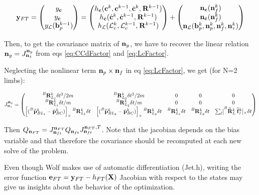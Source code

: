\documentclass[11pt]{article}
\newcommand{\Rot}[2]{\prescript{#1}{}{\bfR}_{#2}}
\newcommand{\Rotm}[2]{\prescript{#1}{}{\widetilde{\bfR}}_{#2}}
\newcommand{\noise}{\bfn}
\newcommand{\bias}{\bfb}
\newcommand{\posim}[2]{\prescript{#1}{}{\widetilde{\bfp}}_{#2}}
\newcommand{\posibar}{\bar{\bfp}}
\newcommand{\forcem}[2]{\prescript{#1}{}{\widetilde{\bff}}_{#2}}
\newcommand{\AM}{\mathcal{L}}
\newcommand{\COM}{\bfc}
\newcommand{\COMd}{\dot{\bfc}}
\begin{document}
\begin{equation}
\bfy_{FT} =
\begin{pmatrix}
y_{\COM} \\ y_{\COMd} \\ y_{\AM}(\bias_{p}^{k-1})
\end{pmatrix}
=
\begin{pmatrix}
h_{\COM}(\COM^{k}, \COM^{k-1}, \COMd^{k}, \Rot{}{}^{k-1})
\\
h_{\COMd}(\COMd^{k}, \COMd^{k-1}, \Rot{}{}^{k-1}) 
\\
h_{\AM}(\AM_c^{k}, \AM_c^{k-1}, \Rot{}{}^{k-1})
\end{pmatrix}
+
\begin{pmatrix}
\noise_{\COM}(\noise_f^{k})
\\
\noise_{\COMd}(\noise_f^{k})
\\
\noise_{\AM}(\bias_{p}^k, \noise_p^k, \noise_f^{k}, \noise_\tau^{k})
\end{pmatrix}
\end{equation}

Then, to get the covariance matrix of $\noise_y$, we have to recover the linear relation $\noise_y = J^{\noise_y}_{\noise_z}$ from eqs \ref{eq:CCdFactor} and \ref{eq:LcFactor}.

Neglecting the nonlinear term $\noise_p \times \noise_f$ in eq \ref{eq:LcFactor}, we get (for N=2 limbs):

\begin{equation}
	J^{\noise_y}_{\noise_z} =
	\begin{pmatrix}
    \Rot{B}{L_1}^k \delta t^2/2m & \Rot{B}{L_2}^k \delta t^2/2m & 0 & 0 & 0 
    \\
    \Rot{B}{L_1}^k \delta t/m & \Rot{B}{L_2}^k \delta t/m & 0 & 0 & 0 
    \\
    \left[(\posim{B}{BL_1}^k - \posibar_{BC}^k) \right]_{\times} \Rot{B}{L_1}^k \delta t & \left[(\posim{B}{BL_2}^k - \posibar_{BC}^k) \right]_{\times} \Rot{B}{L_2}^k \delta t & \Rot{B}{L_1}^k \delta t & \Rot{B}{L_2}^k \delta t & \sum_l [\Rotm{B}{L}^k \forcem{}{l}^k]_{\times} \delta t
	\end{pmatrix}
\end{equation}

Then $Q_{\noise_{FT}} = J^{\noise_{FT}}_{\noise_{ft}} Q_{\noise_{ft}} J^{\noise_{FT},T}_{\noise_{ft}}$. Note that the jacobian depends on the bias variable and that therefore the covariance should be recomputed at each new solve of the problem.

Even though Wolf makes use of automatic differentiation (Jet.h), writing the error function ${\bf e}_{FT} = {\bf y}_{FT}-h_{FT}({\bf X})$ Jacobian with respect to the states may give us insights about the behavior of the optimization.
\end{document}
